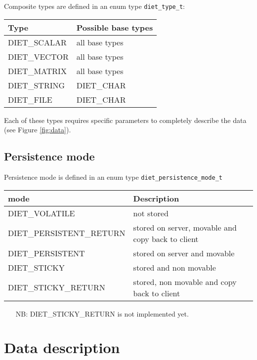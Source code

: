 Composite types are defined in an enum type \texttt{diet\_type\_t}:
\begin{center}
\footnotesize
\begin{tabular}{|l|l|}
\hline
\textbf{Type}&\textbf{Possible base types}\\
\hline
\textsf{DIET\_SCALAR} & all base types\\
\textsf{DIET\_VECTOR} & all base types\\
\textsf{DIET\_MATRIX} & all base types\\
\textsf{DIET\_STRING} & \textsf{DIET\_CHAR}\\
\textsf{DIET\_FILE}   & \textsf{DIET\_CHAR}\\
\hline
\end{tabular}
\end{center}

Each of these types requires specific parameters to completely describe the
data (see Figure \ref{fig:data}).


\subsection{Persistence mode}
\label{ssec:persismode}
Persistence mode is defined in an enum type \texttt{diet\_persistence\_mode\_t}

\begin{center}
\footnotesize
\begin{tabular}{|l|l|}
\hline
\textbf{mode}&\textbf{Description}\\
\hline
\textsf{DIET\_VOLATILE} & not stored\\
\textsf{DIET\_PERSISTENT\_RETURN} & stored on server, movable and copy back to client\\
\textsf{DIET\_PERSISTENT} & stored on server and movable\\
\textsf{DIET\_STICKY} & stored and non movable\\
\hline\hline
\textsf{DIET\_STICKY\_RETURN} & stored, non movable and copy back to client\\
\hline
\end{tabular}
\end{center}

\begin{itemize}
\item[NB:] \textsf{DIET\_STICKY\_RETURN} is not implemented yet.
\end{itemize}

\section{Data description}
\label{sec:datadesc}


